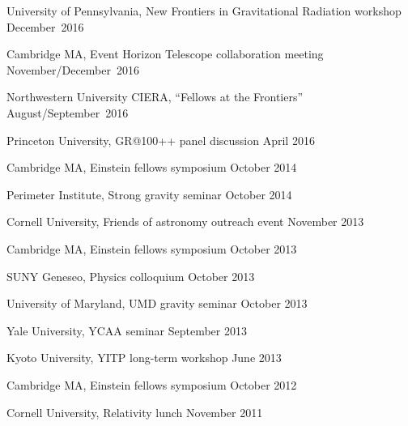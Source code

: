 \begin{etaremune}
  University of Pennsylvania,
  New Frontiers in Gravitational Radiation workshop
  \hfill{}
  December~2016
\item
  Cambridge MA,
  Event Horizon Telescope collaboration meeting
  \hfill{}
  November/December~2016
\item
  Northwestern University CIERA,
  ``Fellows at the Frontiers''
  \hfill{}
  August/September~2016
\item
  Princeton University,
  GR@100++ panel discussion
  \hfill{}
  April 2016
\item
  Cambridge MA,
  Einstein fellows symposium
  \hfill{}
  October 2014
\item
  Perimeter Institute,
  Strong gravity seminar
  \hfill{}
  October 2014
\item
  Cornell University,
  Friends of astronomy outreach event
  \hfill{}
  November 2013
\item
  Cambridge MA,
  Einstein fellows symposium
  \hfill{}
  October 2013
\item
  SUNY Geneseo,
  Physics colloquium
  \hfill{}
  October 2013
\item
  University of Maryland,
  UMD gravity seminar
  \hfill{}
  October 2013
\item
  Yale University,
  YCAA seminar
  \hfill{}
  September 2013
\item
  Kyoto University,
  YITP long-term workshop
  \hfill{}
  June 2013
\item
  Cambridge MA,
  Einstein fellows symposium
  \hfill{}
  October 2012
\item
  Cornell University,
  Relativity lunch
  \hfill{}
  November 2011
\end{etaremune}

